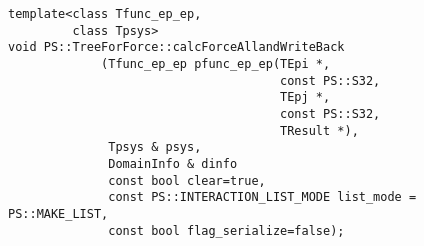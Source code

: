 \label{sec:module_standard_treeforforce_calcforceallandwriteback}

\begin{screen}
\begin{verbatim}
template<class Tfunc_ep_ep,
         class Tpsys>
void PS::TreeForForce::calcForceAllandWriteBack
             (Tfunc_ep_ep pfunc_ep_ep(TEpi *,
                                      const PS::S32,
                                      TEpj *,
                                      const PS::S32,
                                      TResult *),
              Tpsys & psys,
              DomainInfo & dinfo
              const bool clear=true,
              const PS::INTERACTION_LIST_MODE list_mode = PS::MAKE_LIST,
              const bool flag_serialize=false);
\end{verbatim}
\end{screen}

